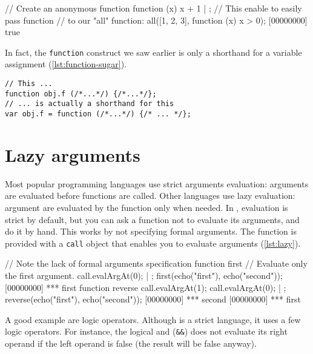 \begin{urbiscript}[caption=Lambda function, label=lst:lambda, name=all]
// Create an anonymous function
function (x) {x + 1} | {};
// This enable to easily pass function
// to our "all" function:
all([1, 2, 3], function (x) { x > 0});
[00000000] true
\end{urbiscript}

In fact, the \texttt{function} construct we saw earlier is only a
shorthand for a variable assignment (\autoref{lst:function-sugar}).

\begin{lstlisting}[caption=The function sugar,
  label=lst:function-sugar]
// This ...
function obj.f (/*...*/) {/*...*/};
// ... is actually a shorthand for this
var obj.f = function (/*...*/) {/* ... */};
\end{lstlisting}

\section{Lazy arguments}

Most popular programming languages use strict arguments evaluation:
arguments are evaluated before functions are called. Other languages
use lazy evaluation: argument are evaluated by the function only when
needed. In \urbi, evaluation is strict by default, but you can ask a
function not to evaluate its arguments, and do it by hand. This works
by not specifying formal arguments. The function is provided with a
\texttt{call} object that enables you to evaluate arguments
(\autoref{lst:lazy}).

\begin{urbiscript}[caption=Tweaking arguments evaluation,
  label=lst:lazy]
// Note the lack of formal arguments specification
function first
{
  // Evaluate only the first argument.
  call.evalArgAt(0);
} | {};
first(echo("first"), echo("second"));
[00000000] *** first
function reverse
{
  call.evalArgAt(1);
  call.evalArgAt(0);
} | {};
reverse(echo("first"), echo("second"));
[00000000] *** second
[00000000] *** first
\end{urbiscript}

A good example are logic operators. Although \Cxx is a strict
language, it uses a few logic operators. For instance, the logical and
(\texttt{\&\&}) does not evaluate its right operand if the left
operand is false (the result will be false anyway).

